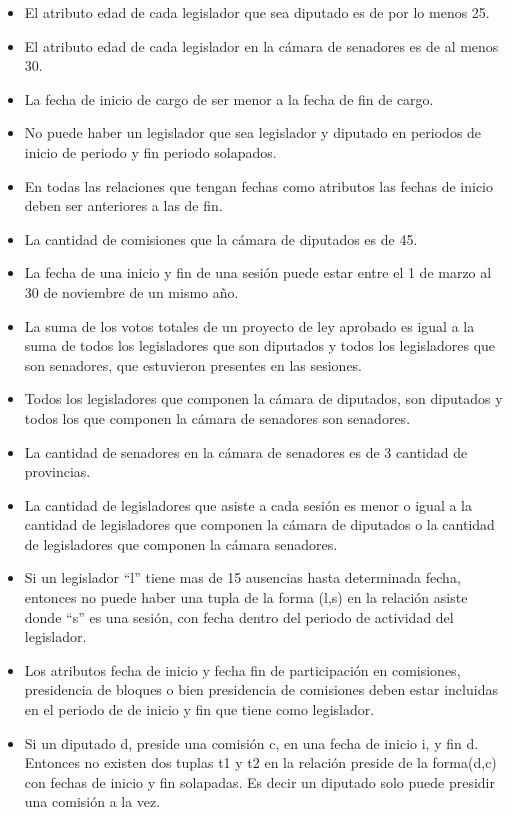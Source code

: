 \begin{itemize}
	\item El atributo edad de cada legislador que sea diputado es de por lo menos 25.
	\item El atributo edad  de cada legislador en la c\'amara de senadores es de al menos 30.
	\item La fecha de inicio de cargo de ser menor a la fecha de fin de cargo.
	\item No puede haber un legislador que sea legislador y diputado en periodos de
	 inicio de periodo y fin periodo solapados.
	
	\item En todas las relaciones que tengan fechas como atributos las fechas de inicio
	 deben ser anteriores a las de fin.
	
	\item La cantidad de comisiones que la c\'amara de diputados es de 45.
	
	\item La fecha de una inicio y fin de una sesi\'on puede estar entre el 1 de marzo al 30 de noviembre de un mismo a\~no.
	
	\item La suma de los votos totales de un proyecto de ley aprobado es igual a la suma de todos los legisladores que son diputados y todos los legisladores que son senadores, que estuvieron presentes en las sesiones.
	
	\item Todos los legisladores que componen la c\'amara de diputados, son diputados y todos los que componen la c\'amara de senadores son senadores.
	
	\item La cantidad de senadores en la c\'amara de senadores es de 3\* cantidad de provincias.
	
	\item La cantidad de legisladores que asiste a cada sesi\'on es menor o igual a la cantidad de legisladores que componen la c\'amara de diputados o la cantidad de legisladores que componen la c\'amara senadores.
	
	\item Si un legislador ``l'' tiene mas de 15 ausencias hasta determinada fecha, entonces no puede haber una tupla de la forma (l,s) en la relaci\'on asiste donde ``s'' es una sesi\'on, con fecha dentro del periodo de actividad del legislador.
	
	\item Los atributos fecha de inicio y fecha fin de participaci\'on en comisiones, presidencia de bloques o bien presidencia de comisiones deben estar incluidas en el periodo de de inicio y fin que tiene como legislador.
	
	\item Si un diputado d, preside una comisi\'on c, en una fecha de inicio i, y fin d. Entonces no existen dos tuplas t1 y t2 en la relaci\'on preside de la forma(d,c) con fechas de inicio y fin solapadas. Es decir un diputado solo puede presidir una comisi\'on a la vez.


\end{itemize}	